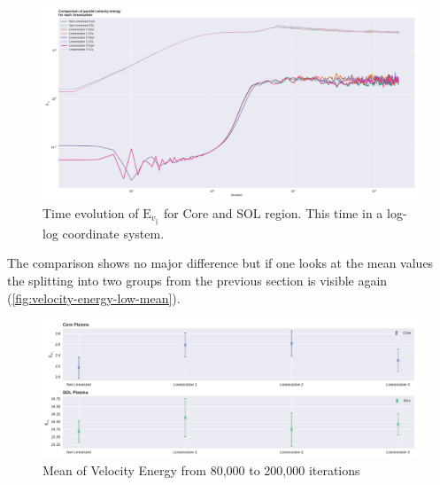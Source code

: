 \documentclass[master.tex]{subfiles}
\begin{document}
\begin{figure}[!htbp]
    \includegraphics[width=\linewidth]{pdfs/velocity-energy-low.pdf}
    \caption{Time evolution of $\mathrm{E}_{v_\parallel}$ for Core and \ac{SOL} region. This time in a log-log coordinate system.}
    \label{fig:velocity-energy-low}
\end{figure}

The comparison shows no major difference but if one looks at the mean values the splitting into two groups from the previous section is visible again (\autoref{fig:velocity-energy-low-mean}).


\begin{figure}[!htbp]
    \includegraphics[width=\linewidth]{pdfs/velocity-energy-low-means.pdf}
    \caption{Mean of Velocity Energy from 80,000 to 200,000 iterations}
    \label{fig:velocity-energy-low-mean}
\end{figure}
\end{document}
